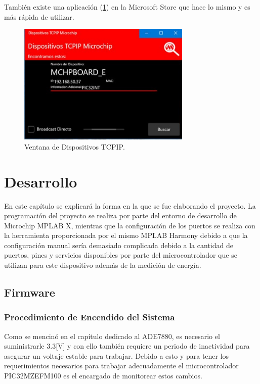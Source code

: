 \documentclass[letterpaper,12pt,oneside]{book}
\begin{document}
			También existe una aplicación (\ref{TCPIP2}) en la Microsoft Store que hace lo mismo y es más rápida de utilizar.

			\begin{figure}[!htpb]
				\centering
				\includegraphics[scale = 0.8]{Material de Consulta/DispTCP.PNG}
				\caption[Dispositivos TCPIP]{Ventana de Dispositivos TCPIP.}
				\label{TCPIP2}
			\end{figure}

	\chapter{Desarrollo}
		En este capítulo se explicará la forma en la que se fue elaborando el proyecto. La programación del proyecto se realiza por parte del entorno de desarrollo de Microchip MPLAB X, mientras que la configuración de los puertos se realiza con la herramienta proporcionada por el mismo MPLAB Harmony debido a que la configuración manual sería demasiado complicada debido a la cantidad de puertos, pines y servicios disponibles por parte del microcontrolador que se utilizan para este dispositivo además de la medición de energía.

		\section{Firmware}
			\subsection{Procedimiento de Encendido del Sistema}
			Como se mencinó en el capítulo dedicado al ADE7880, es necesario el suministrarle 3.3[V] y con ello también requiere un periodo de inactividad para asegurar un voltaje estable para trabajar. Debido a esto y para tener los requerimientos necesarios para trabajar adecuadamente el microcontrolador PIC32MZEFM100 es el encargado de monitorear estos cambios.
\end{document}

